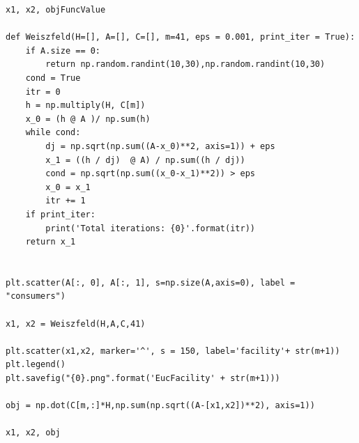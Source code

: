 \documentclass[12pt]{article}
\begin{document}
\begin{lstlisting}[style=pythonstyle,numbers=none]
x1, x2, objFuncValue

def Weiszfeld(H=[], A=[], C=[], m=41, eps = 0.001, print_iter = True):
    if A.size == 0:
        return np.random.randint(10,30),np.random.randint(10,30)
    cond = True
    itr = 0
    h = np.multiply(H, C[m])
    x_0 = (h @ A )/ np.sum(h)
    while cond:
        dj = np.sqrt(np.sum((A-x_0)**2, axis=1)) + eps
        x_1 = ((h / dj)  @ A) / np.sum((h / dj))
        cond = np.sqrt(np.sum((x_0-x_1)**2)) > eps
        x_0 = x_1
        itr += 1
    if print_iter:
        print('Total iterations: {0}'.format(itr))
    return x_1


plt.scatter(A[:, 0], A[:, 1], s=np.size(A,axis=0), label = "consumers")

x1, x2 = Weiszfeld(H,A,C,41)

plt.scatter(x1,x2, marker='^', s = 150, label='facility'+ str(m+1))
plt.legend()
plt.savefig("{0}.png".format('EucFacility' + str(m+1)))

obj = np.dot(C[m,:]*H,np.sum(np.sqrt((A-[x1,x2])**2), axis=1))

x1, x2, obj


\end{lstlisting}
\end{document}
